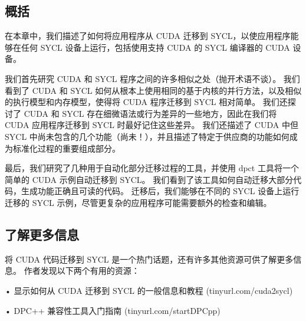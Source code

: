 \subsection{概括}
在本章中，我们描述了如何将应用程序从 CUDA 迁移到 SYCL，以使应用程序能够在任何 SYCL 设备上运行，包括使用支持 CUDA 的 SYCL 编译器的 CUDA 设备。

我们首先研究 CUDA 和 SYCL 程序之间的许多相似之处（抛开术语不谈）。 我们看到了 CUDA 和 SYCL 如何从根本上使用相同的基于内核的并行方法，以及相似的执行模型和内存模型，使得将 CUDA 程序迁移到 SYCL 相对简单。 我们还探讨了 CUDA 和 SYCL 存在细微语法或行为差异的一些地方，因此在我们将 CUDA 应用程序迁移到 SYCL 时最好记住这些差异。 我们还描述了 CUDA 中但 SYCL 中尚未包含的几个功能（尚未！），并且描述了特定于供应商的功能如何成为标准化过程的重要组成部分。

最后，我们研究了几种用于自动化部分迁移过程的工具，并使用 dpct 工具将一个简单的 CUDA 示例自动迁移到 SYCL。 我们看到了该工具如何自动迁移大部分代码，生成功能正确且可读的代码。 迁移后，我们能够在不同的 SYCL 设备上运行迁移的 SYCL 示例，尽管更复杂的应用程序可能需要额外的检查和编辑。

\subsection{了解更多信息}
将 CUDA 代码迁移到 SYCL 是一个热门话题，还有许多其他资源可供了解更多信息。 作者发现以下两个有用的资源：

• 显示如何从 CUDA 迁移到 SYCL 的一般信息和教程 (tinyurl.com/cuda2sycl)

• DPC++ 兼容性工具入门指南 (tinyurl.com/startDPCpp)